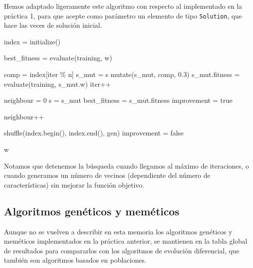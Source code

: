 \documentclass[12pt]{article}
\begin{document}
Hemos adaptado ligeramente este algoritmo con respecto al implementado en la práctica 1, para que acepte como parámetro un elemento de tipo \verb|Solution|, que hace las veces de solución inicial.\\

\vspace{20em}

\begin{algorithm}[ht!]
\begin{algorithmic}


\State index = initialize() 

\State best\_fitness = evaluate(training, w)

    \State comp = index[iter $\%$ n] 
    \State s\_mut = s
    \State mutate(s\_mut, comp, $0.3$)
    \State s\_mut.fitness = evaluate(training, s\_mut.w)
    \State iter++

      \State neighbour = $0$
      \State s = s\_mut
      \State best\_fitness = s\_mut.fitness
      \State improvement = true

    \Else
      \State neighbour++
    \EndIf

      \State shuffle(index.begin(), index.end(), gen)
      \State improvement = false
    \EndIf
  \EndWhile

\State \Return w
\EndFunction

\end{algorithmic}
\end{algorithm}

Notamos que detenemos la búsqueda cuando llegamos al máximo de iteraciones, o cuando generamos un número de vecinos (dependiente del número de características) sin mejorar la función objetivo.

\subsection*{{\color{red} Algoritmos genéticos y meméticos}}

Aunque no se vuelven a describir en esta memoria los algoritmos genéticos y meméticos implementados en la práctica anterior, se mantienen en la tabla global de resultados para compararlos con los algoritmos de evolución diferencial, que también son algoritmos basados en poblaciones.
\end{document}
